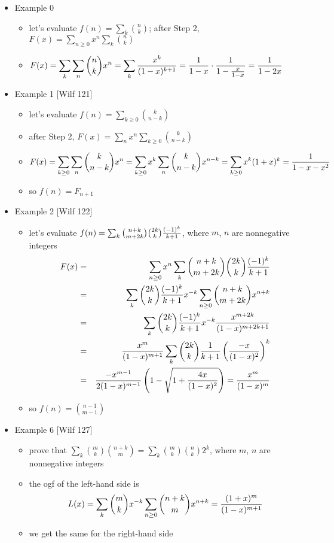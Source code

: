 \documentclass[10pt, a4paper]{article}
\begin{document}
\begin{itemize}
\item
Example 0
\begin{itemize}
    \item let's evaluate $f(n) = \sum_k {n\choose k}$; after Step 2, $F(x) = \sum_{n\ge 0} x^n \sum_k {n\choose k}$
    \item $\displaystyle F(x) = \sum_k \sum_n {n\choose k}x^n = \sum_k {x^k\over (1-x)^{k+1}}={1\over 1-x}\cdot {1\over 1-{x\over 1-x}}={1\over 1-2x}$
\end{itemize}

\item
Example 1 [Wilf 121]
\begin{itemize}
    \item let's evaluate $f(n) = \sum_{k\ge 0} {k\choose n-k}$
    \item after Step 2, $F(x) = \sum_n x^n \sum_{k\ge 0} {k\choose n-k}$
    \item $\displaystyle F(x) = \sum_{k\ge 0} \sum_n {k\choose n-k}x^n = \sum_{k\ge 0}x^k\sum_n {k\choose n-k}x^{n-k} = \sum_{k\ge 0}x^k (1+x)^k = {1\over 1-x-x^2}$
    \item so $f(n) = F_{n+1}$
\end{itemize}

\item
Example 2 [Wilf 122]
\begin{itemize}
    \item let's evaluate $f(n) = \sum_{k} {n+k\choose m+2k}{2k\choose k}{(-1)^k\over k+1}$, where $m$, $n$ are nonnegative integers
        \begin{eqnarray*}
        F(x) &=& \sum_{n\ge 0} x^n \sum_{k} {n+k\choose m+2k}{2k\choose k}{(-1)^k\over k+1} \\
             &=& \sum_k {2k\choose k}{(-1)^k\over k+1}x^{-k}\sum_{n\ge 0}{n+k\choose m+2k}x^{n+k}\\
             &=& \sum_k {2k\choose k}{(-1)^k\over k+1}x^{-k}{x^{m+2k}\over (1-x)^{m+2k+1}}\\
             &=& {x^m\over (1-x)^{m+1}}\sum_k {2k\choose k}{1\over k+1}\left({-x\over (1-x)^2}\right)^k \\
             &=& {-x^{m-1}\over 2(1-x)^{m-1}}\left(1-\sqrt{1+{4x\over (1-x)^2}}\right) = {x^m\over (1-x)^m}
        \end{eqnarray*}
    \item so $f(n) = {n-1\choose m-1}$
\end{itemize}

\item
Example 6 [Wilf 127]
\begin{itemize}
    \item prove that $\sum_{k} {m\choose k}{n+k\choose m} = \sum_k {m\choose k}{n\choose k}2^k$, where $m$, $n$ are nonnegative integers
    \item the ogf of the left-hand side is
        $$L(x) = \sum_{k} {m\choose k} x^{-k}\sum_{n\ge 0}{n+k\choose m}x^{n+k} ={(1+x)^m\over (1-x)^{m+1}}$$
    \item we get the same for the right-hand side
\end{itemize}


\end{itemize}
\end{document}
